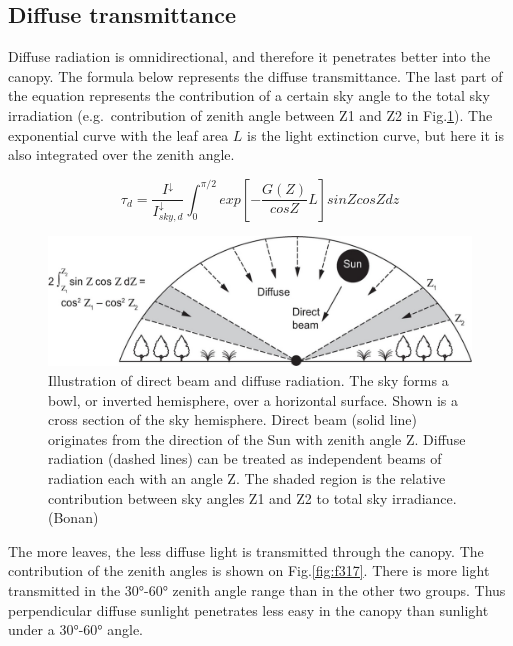 \documentclass[
  12pt,
  oneside]{book}
\begin{document}
\hypertarget{diffuse-transmittance}{%
\subsection{Diffuse transmittance}\label{diffuse-transmittance}}

Diffuse radiation is omnidirectional, and therefore it penetrates better into the canopy. The formula below represents the diffuse transmittance. The last part of the equation represents the contribution of a certain sky angle to the total sky irradiation (e.g.~contribution of zenith angle between Z1 and Z2 in Fig.\ref{fig:f316}). The exponential curve with the leaf area \(L\) is the light extinction curve, but here it is also integrated over the zenith angle.

\[
\tau_d = \frac{I^{\downarrow}}{I^{\downarrow}_{sky,d}} \int_0^{\pi/2} exp\left[- \frac{G(Z)}{cosZ}L \right] sinZcosZdz
\]

\begin{figure}

{\centering \includegraphics[width=0.8\linewidth]{figures/chap3/f316_diffuse} 

}

\caption{Illustration of direct beam and diffuse radiation. The sky forms a bowl, or inverted hemisphere, over a horizontal surface. Shown is a cross section of the sky hemisphere. Direct beam (solid line) originates from the  direction of the Sun with zenith angle Ζ. Diffuse radiation (dashed lines) can be treated as independent beams of radiation each with an angle Ζ. The shaded region is the relative contribution between sky angles Ζ1 and Ζ2 to total sky irradiance.(Bonan)}\label{fig:f316}
\end{figure}

The more leaves, the less diffuse light is transmitted through the canopy. The contribution of the zenith angles is shown on Fig.\ref{fig:f317}. There is more light transmitted in the 30°-60° zenith angle range than in the other two groups. Thus perpendicular diffuse sunlight penetrates less easy in the canopy than sunlight under a 30°-60° angle.
\end{document}
